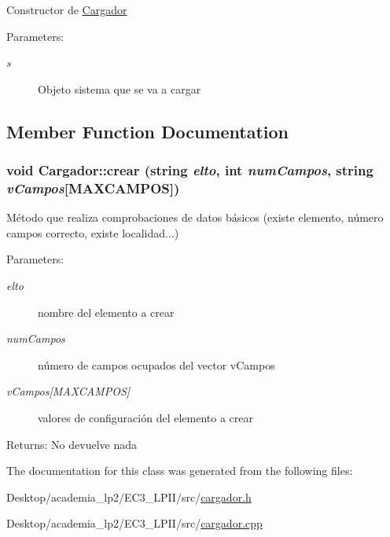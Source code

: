 Constructor de \hyperlink{classCargador}{Cargador} \begin{Desc}
\item[Parameters:]
\begin{description}
\item[{\em s}]Objeto sistema que se va a cargar \end{description}
\end{Desc}


\subsection{Member Function Documentation}
\hypertarget{classCargador_60d8fe515f1ff623da7bcdd2d842e4fe}{
\subsubsection[crear]{\setlength{\rightskip}{0pt plus 5cm}void Cargador::crear (string {\em elto}, \/  int {\em numCampos}, \/  string {\em vCampos}\mbox{[}MAXCAMPOS\mbox{]})}}
\label{classCargador_60d8fe515f1ff623da7bcdd2d842e4fe}


Método que realiza comprobaciones de datos básicos (existe elemento, número campos correcto, existe localidad...) \begin{Desc}
\item[Parameters:]
\begin{description}
\item[{\em elto}]nombre del elemento a crear \item[{\em numCampos}]número de campos ocupados del vector vCampos \item[{\em vCampos\mbox{[}MAXCAMPOS\mbox{]}}]valores de configuración del elemento a crear \end{description}
\end{Desc}
\begin{Desc}
\item[Returns:]No devuelve nada \end{Desc}


The documentation for this class was generated from the following files:\begin{CompactItemize}
\item 
Desktop/academia\_\-lp2/EC3\_\-LPII/src/\hyperlink{cargador_8h}{cargador.h}\item 
Desktop/academia\_\-lp2/EC3\_\-LPII/src/\hyperlink{cargador_8cpp}{cargador.cpp}\end{CompactItemize}
